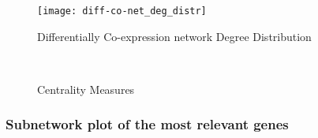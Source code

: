 \documentclass[
10pt, %
a4paper, %
oneside, %
headinclude,footinclude, %
BCOR5mm, %
]{scrartcl}
\begin{document}
\begin{figure}[H]
\centering 
\texttt{[image: diff-co-net\_deg\_distr]} 
\caption[Differentially Co-expression network Degree Distribution]{Differentially Co-expression network Degree Distribution} %
\label{fig:9} 
\end{figure}

\begin{figure}[H]
\centering
{} \quad
{} \\
 \quad
{}
\caption[Centrality Measures Differential Co-Net]{Centrality Measures} %
\label{fig:10}
\end{figure}

\subsubsection{Subnetwork plot of the most relevant genes}
\end{document}
